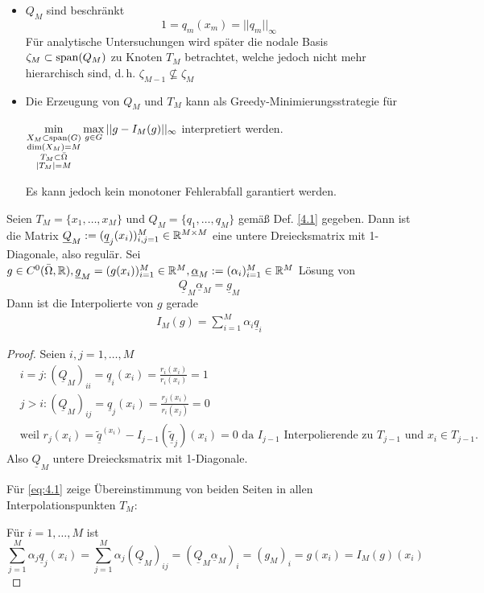 \begin{bem} \beginwithlistbem
	\begin{itemize}
		\item $Q_M$ sind beschränkt
		\[
			1 = q_m(x_m) = || q_m||_{\infty}
		\]
		Für analytische Untersuchungen wird später die nodale Basis $\zeta_M \subset \operatorname{span} (Q_M)$ zu Knoten $T_M$ betrachtet, welche jedoch nicht mehr hierarchisch sind, d.\,h. $\zeta_{M-1} \not\subseteq \zeta_M$
		\item Die Erzeugung von $Q_M$ und $T_M$ kann als Greedy-Minimierungsstrategie  für
		
		 $\min\limits_{\substack{X_M \subset \operatorname{span}(G) \\ \dim(X_M) = M \\ T_M \subset \bar{\Omega} \\ |T_M| = M}} \max\limits_{g \in G} ||g - I_M (g) ||_{\infty}$ interpretiert werden.
		
		Es kann jedoch kein monotoner Fehlerabfall garantiert werden.
	\end{itemize}
\end{bem}

\begin{satz}
Seien $T_M = \{x_1,\dots,x_M\}$ und $Q_M = \{q_1,\dots,q_M\}$ gemäß Def. \ref{4.1} gegeben. Dann ist die Matrix $\underline{Q}_M := (\underline{q}_j(x_i))_{i,j=1}^M \in \mathbb{R}^{M \times M}$ eine untere Dreiecksmatrix mit 1-Diagonale, also regulär.
Sei $g \in C^0 (\bar{\Omega},\mathbb{R}), \underline{g}_M = (g(x_i))_{i=1}^M \in \mathbb{R}^M, \underline{\alpha}_M := (\alpha_i)_{i=1}^M \in \mathbb{R}^M$ Lösung von
\[
	\underline{Q}_M \underline{\alpha}_M = \underline{g}_M
\]
Dann ist die Interpolierte von $g$ gerade
\begin{align} \label{eq:4.1}
I_M (g) = \sum\limits_{i=1}^M \alpha_i \underline{q}_i
\end{align}
\begin{proof}
Seien $i,j = 1,\dots,M$
\begin{align*}
&i=j: (\underline{Q}_M)_{ii} = \underline{q}_i(x_i) = \frac{r_i(x_i)}{r_i(x_i)} = 1 \\
&j>i: (\underline{Q}_M)_{ij} = \underline{q}_j(x_i) = \frac{r_j(x_i)}{r_i(x_j)} = 0 \\
&\text{weil } r_j(x_i) = \underline{\tilde{q}}^{(x_i)} - I_{j-1}(\underline{\tilde{q}}_j)(x_i) = 0 \text{ da } I_{j-1} \text{ Interpolierende zu } T_{j-1} \text{ und } x_i \in T_{j-1}.
\end{align*}
Also $\underline{Q}_M$ untere Dreiecksmatrix mit 1-Diagonale.

Für \ref{eq:4.1} zeige Übereinstimmung von beiden Seiten in allen Interpolationspunkten $T_M$:

Für $i=1,\dots,M$ ist
\[
	\sum\limits_{j=1}^M \alpha_j \underline{q}_j(x_i) = \sum\limits_{j=1}^M \alpha_j (\underline{Q}_M)_{ij} = (\underline{Q}_M \underline{\alpha}_M)_i = (g_M)_i = g(x_i) = I_M(g)(x_i)
\]
\end{proof}
\end{satz}

